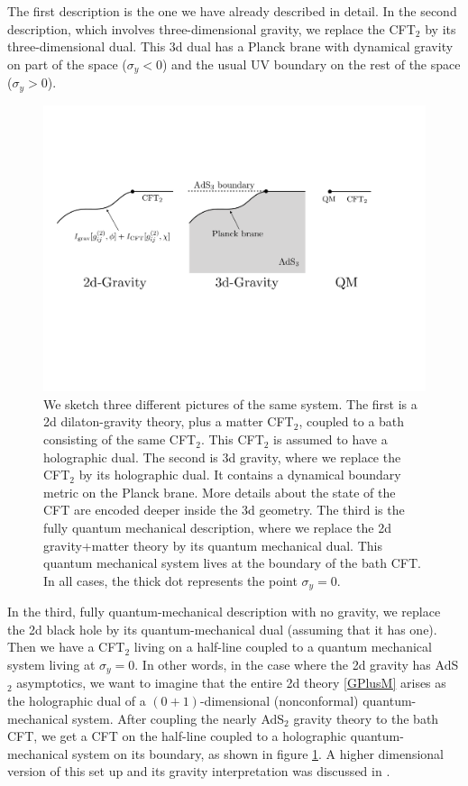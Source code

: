 \documentclass[12pt]{article}
\begin{document}
The first description is the one we have already described in detail.
In the second description, which involves three-dimensional gravity, we replace the CFT$_2$ by its three-dimensional dual. 
This 3d dual has a Planck brane with dynamical gravity on part of the space ($\sigma_y<0$) and the usual UV boundary on the rest of the space ($\sigma_y>0$). 

\begin{figure}[t]
    \begin{center}
    \includegraphics[scale=.48]{Figures/ThreePictures}
    \end{center}
    \caption{We sketch three different pictures of the same system.
    The first is a 2d dilaton-gravity theory, plus a matter CFT$_2$, coupled to a bath consisting of the same CFT$_2$. 
    This CFT$_2$ is assumed to have a holographic dual.
    The second is 3d gravity, where we replace the CFT$_2$ by its holographic dual.
    It contains a dynamical boundary metric on the Planck brane.  
    More details about the state of the CFT are encoded deeper inside the 3d geometry.
    The third is the fully quantum mechanical description, where we replace the 2d gravity+matter theory by its quantum mechanical dual. This quantum mechanical system lives at the boundary of the bath CFT.
    In all cases, the thick dot represents the point $\sigma_y=0$.}
    \label{ThreePictures}
\end{figure}


In the third, fully quantum-mechanical description with no gravity, we replace the 2d black hole by its quantum-mechanical dual (assuming that it has one). 
Then we have a CFT$_2$ living on a half-line coupled to a quantum mechanical system living at $\sigma_y=0$. 
In other words, in the case where the 2d gravity has AdS$_2$ asymptotics, we want to imagine that the entire 2d theory \eqref{GPlusM} arises as the holographic dual of a $(0+1)$-dimensional (nonconformal) quantum-mechanical system. 
After coupling the nearly AdS$_2$ gravity theory to the bath CFT, we get a CFT on the half-line coupled to a holographic quantum-mechanical system on its boundary, as shown in figure \ref{ThreePictures}. 
A higher dimensional version of this set up and its gravity interpretation was discussed in \cite{Karch:2000ct}.
\end{document}
